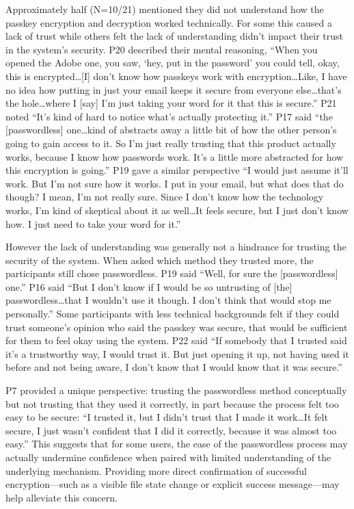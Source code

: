 Approximately half (N=10/21) mentioned they did not understand how the passkey encryption and decryption worked technically. For some this caused a lack of trust while others felt the lack of understanding didn't impact their trust in the system's security. P20 described their mental reasoning, ``When you opened the Adobe one, you saw, `hey, put in the password' you could tell, okay, this is encrypted\ldots [I] don't know how passkeys work with encryption\ldots Like, I have no idea how putting in just your email keeps it secure from everyone else\ldots that's the hole\ldots where I [say] I'm just taking your word for it that this is secure.'' P21 noted ``It's kind of hard to notice what's actually protecting it.'' P17 said ``the [passwordless] one\ldots kind of abstracts away a little bit of how the other person's going to gain access to it. So I'm just really trusting that this product actually works, because I know how passwords work. It's a little more abstracted for how this encryption is going.'' P19 gave a similar perspective ``I would just assume it'll work. But I'm not sure how it works. I put in your email, but what does that do though? I mean, I'm not really sure. Since I don't know how the technology works, I'm kind of skeptical about it as well\ldots It feels secure, but I just don't know how. I just need to take your word for it.''

However the lack of understanding was generally not a hindrance for trusting the security of the system. When asked which method they trusted more, the participants still chose passwordless. P19 said ``Well, for sure the [passwordless] one.'' P16 said ``But I don't know if I would be so untrusting of [the] passwordless\ldots that I wouldn't use it though. I don't think that would stop me personally.'' Some participants with less technical backgrounds felt if they could trust someone's opinion who said the passkey was secure, that would be sufficient for them to feel okay using the system. P22 said ``If somebody that I trusted said it's a trustworthy way, I would trust it. But just opening it up, not having used it before and not being aware, I don't know that I would know that it was secure.''

P7 provided a unique perspective: trusting the passwordless method conceptually but not trusting that they used it correctly, in part because the process felt too easy to be secure: ``I trusted it, but I didn't trust that I made it work\ldots It felt secure, I just wasn't confident that I did it correctly, because it was almost too easy.'' This suggests that for some users, the ease of the passwordless process may actually undermine confidence when paired with limited understanding of the underlying mechanism. Providing more direct confirmation of successful encryption---such as a visible file state change or explicit success message---may help alleviate this concern.

